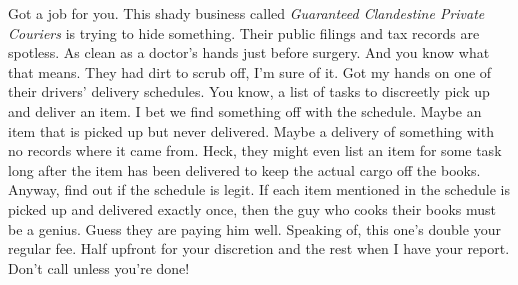 




Got a job for you. 
This shady business called \emph{Guaranteed Clandestine Private Couriers} is trying to hide something.
Their public filings and tax records are spotless.
As clean as a doctor's hands just before surgery.
And you know what that means.
They had dirt to scrub off, I'm sure of it.
Got my hands on one of their drivers' delivery schedules.
You know, a list of tasks to discreetly pick up and deliver an item.
I bet we find something off with the schedule.
Maybe an item that is picked up but never delivered.
Maybe a delivery of something with no records where it came from.
Heck, they might even list an item for some task long after the item has been delivered to keep the actual cargo off the books.
Anyway, find out if the schedule is legit.
If each item mentioned in the schedule is picked up and delivered exactly once, then the guy who cooks their books must be a genius.
Guess they are paying him well.
Speaking of, this one's double your regular fee. 
Half upfront for your discretion and the rest when I have your report.
Don't call unless you're done!

